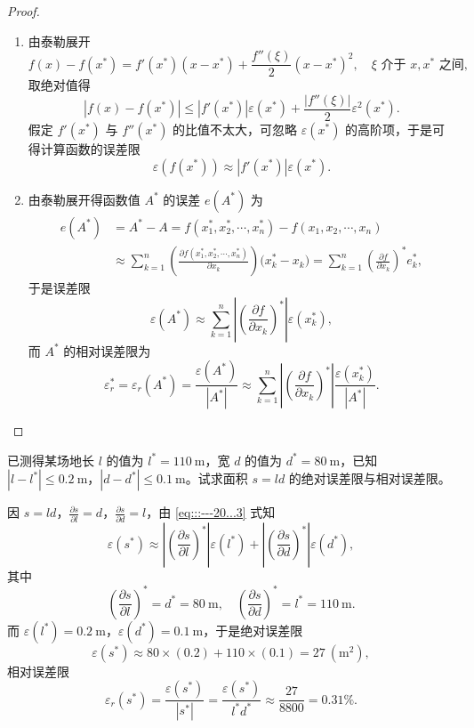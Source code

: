 \documentclass[../../main.tex]{subfiles}
\begin{document}
\begin{proof}
\begin{enumerate}
\item 由泰勒展开 
\[
f(x) - f(x^*) = f'(x^*)(x - x^*) + \frac{f''(\xi)}{2}(x - x^*)^2, \quad \xi \text{ 介于 } x, x^* \text{ 之间},
\]
取绝对值得 
\[
| f(x) - f(x^*) | \leqslant | f'(x^*) | \varepsilon(x^*) + \frac{| f''(\xi) |}{2} \varepsilon^2(x^*).
\]
假定 $f'(x^*)$ 与 $f''(x^*)$ 的比值不太大，可忽略 $\varepsilon(x^*)$ 的高阶项，于是可得计算函数的误差限 
\[
\varepsilon(f(x^*)) \approx | f'(x^*) | \varepsilon(x^*).
\]

\item 由泰勒展开得函数值 $A^*$ 的误差 $e(A^*)$ 为 
\begin{align*}
e(A^*)&=A^*-A=f(x_{1}^{*},x_{2}^{*},\cdots ,x_{n}^{*})-f(x_1,x_2,\cdots ,x_n)
\\
&\approx \sum_{k=1}^n{\left( \frac{\partial f(x_{1}^{*},x_{2}^{*},\cdots ,x_{n}^{*})}{\partial x_k} \right) (x_{k}^{*}}-x_k)=\sum_{k=1}^n{\left( \frac{\partial f}{\partial x_k} \right) ^*e_{k}^{*}},
\end{align*}
于是误差限 
\[
\varepsilon(A^*) \approx \sum_{k=1}^n \left| \left( \frac{\partial f}{\partial x_k} \right)^* \right| \varepsilon(x_k^*) ,
\]
而 $A^*$ 的相对误差限为 
\[
\varepsilon_r^* = \varepsilon_r(A^*) = \frac{\varepsilon(A^*)}{| A^* |} \approx \sum_{k=1}^n \left| \left( \frac{\partial f}{\partial x_k} \right)^* \right| \frac{\varepsilon(x_k^*)}{| A^* |} .
\]
\end{enumerate}

\end{proof}

\begin{example}
已测得某场地长 $l$ 的值为 $l^* = 110\ \mathrm{m}$，宽 $d$ 的值为 $d^* = 80\ \mathrm{m}$，已知 $| l - l^* | \leqslant 0.2\ \mathrm{m}$，$| d - d^* | \leqslant 0.1\ \mathrm{m}$。试求面积 $s = ld$ 的绝对误差限与相对误差限。
\end{example}
\begin{solution}
因 $s = ld$，$\frac{\partial s}{\partial l} = d$，$\frac{\partial s}{\partial d} = l$，由 \eqref{eq:::---20...3} 式知 
\[
\varepsilon(s^*) \approx \left| \left( \frac{\partial s}{\partial l} \right)^* \right| \varepsilon(l^*) + \left| \left( \frac{\partial s}{\partial d} \right)^* \right| \varepsilon(d^*),
\]
其中 
\[
\left( \frac{\partial s}{\partial l} \right)^* = d^* = 80\ \mathrm{m}, \quad \left( \frac{\partial s}{\partial d} \right)^* = l^* = 110\ \mathrm{m}.
\]
而 $\varepsilon(l^*) = 0.2\ \mathrm{m}$，$\varepsilon(d^*) = 0.1\ \mathrm{m}$，于是绝对误差限 
\[
\varepsilon(s^*) \approx 80 \times (0.2) + 110 \times (0.1) = 27\ (\mathrm{m^2}),
\]
相对误差限 
\[
\varepsilon_r(s^*) = \frac{\varepsilon(s^*)}{| s^* |} = \frac{\varepsilon(s^*)}{l^* d^*} \approx \frac{27}{8800} = 0.31\%.
\]

\end{solution}
\end{document}
